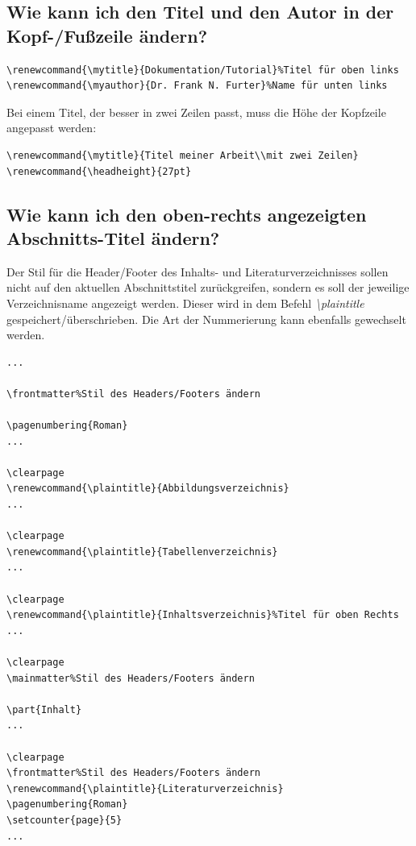 \documentclass[12pt]{article}
\begin{document}
\subsection{Wie kann ich den Titel und den Autor in der Kopf-/Fußzeile ändern?}
\begin{verbatim}
\renewcommand{\mytitle}{Dokumentation/Tutorial}%Titel für oben links
\renewcommand{\myauthor}{Dr. Frank N. Furter}%Name für unten links
\end{verbatim}
Bei einem Titel, der besser in zwei Zeilen passt, muss die Höhe der Kopfzeile angepasst werden:
\begin{verbatim}
\renewcommand{\mytitle}{Titel meiner Arbeit\\mit zwei Zeilen}
\renewcommand{\headheight}{27pt}
\end{verbatim}

\subsection{Wie kann ich den oben-rechts angezeigten Abschnitts-Titel ändern?}
Der Stil für die Header/Footer des Inhalts- und Literaturverzeichnisses sollen nicht auf den aktuellen Abschnittstitel zurückgreifen, sondern es soll der jeweilige Verzeichnisname angezeigt werden. Dieser wird in dem Befehl \textit{\textbackslash plaintitle} gespeichert/überschrieben. Die Art der Nummerierung kann ebenfalls gewechselt werden.
\begin{verbatim}
...

\frontmatter%Stil des Headers/Footers ändern

\pagenumbering{Roman}
...

\clearpage
\renewcommand{\plaintitle}{Abbildungsverzeichnis}
...

\clearpage
\renewcommand{\plaintitle}{Tabellenverzeichnis}
...

\clearpage
\renewcommand{\plaintitle}{Inhaltsverzeichnis}%Titel für oben Rechts
...

\clearpage
\mainmatter%Stil des Headers/Footers ändern

\part{Inhalt}
...

\clearpage
\frontmatter%Stil des Headers/Footers ändern
\renewcommand{\plaintitle}{Literaturverzeichnis}
\pagenumbering{Roman}
\setcounter{page}{5}
...
\end{verbatim}
\end{document}
